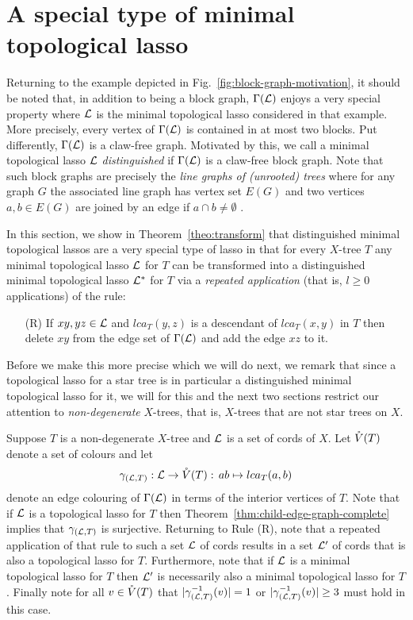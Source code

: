 \section{A special type of minimal topological lasso}
\label{sec:distinguished}

Returning to the example depicted in Fig.~\ref{fig:block-graph-motivation}, it
should be noted that, in addition to being a block graph, $\Gamma({\mathcal L})$ enjoys
a very special property where ${\mathcal L}$ is the minimal topological lasso
considered in that example. More precisely, every vertex of $\Gamma({\mathcal L})$ is
contained in at most two blocks.  Put differently, $\Gamma({\mathcal L})$ is a
claw-free graph. Motivated by this, we call a minimal topological lasso ${\mathcal L}$
{\em distinguished} if $\Gamma({\mathcal L})$ is a claw-free block graph.  Note that
such block graphs are precisely the {\em line graphs of (unrooted) trees}
where for any graph $G$ the associated line graph has vertex set $E(G)$ and
two vertices $a,b\in E(G)$ are joined by an edge if $a\cap b\not=\emptyset$
\cite{H72}.

In this section, we show in Theorem~\ref{theo:transform} that distinguished
minimal topological lassos are a very special type of lasso in that for every
$X$-tree $T$ any minimal topological lasso ${\mathcal L}$ for $T$ can be transformed
into a distinguished minimal topological lasso ${\mathcal L}^*$ for $T$ via a {\em
  repeated application} (that is, $l\geq 0$ applications) of the rule:

\begin{enumerate}
\item[(R)] If $xy,yz\in {\mathcal L}$ and $lca_T(y,z)$ is a descendant of $lca_T(x,y)$
  in $T$ then delete $xy$ from the edge set of $\Gamma({\mathcal L})$ and add the edge
  $xz$ to it.
\end{enumerate}

Before we make this more precise which we will do next, we remark that since a
topological lasso for a star tree is in particular a distinguished minimal
topological lasso for it, we will for this and the next two sections restrict
our attention to {\em non-degenerate} $X$-trees, that is, $X$-trees that are
not star trees on $X$.

Suppose $T$ is a non-degenerate $X$-tree and ${\mathcal L}$ is a set of cords of
$X$. Let $\mathring{V}(T)$ denote a set of colours and let
$$
\gamma_{({\mathcal L},T)}:{\mathcal L}\to \mathring{V}(T):\, ab\mapsto lca_T(a,b)
$$
denote an edge colouring of $\Gamma({\mathcal L})$ in terms of the interior vertices of
$T$. Note that if ${\mathcal L}$ is a topological lasso for $T$ then
Theorem~\ref{thm:child-edge-graph-complete} implies that $\gamma_{({\mathcal L},T)}$
is surjective. Returning to Rule (R), note that a repeated application of that
rule to such a set ${\mathcal L}$ of cords results in a set ${\mathcal L}'$ of cords that is
also a topological lasso for $T$. Furthermore, note that if ${\mathcal L}$ is a minimal
topological lasso for $T$ then ${\mathcal L}'$ is necessarily also a minimal
topological lasso for $T$. Finally note for all $v\in \mathring{V}(T)$ that
$|\gamma_{({\mathcal L},T)}^{-1}(v)|=1$ or $|\gamma_{({\mathcal L},T)}^{-1}(v)|\geq 3$ must hold
in this case.


